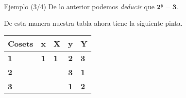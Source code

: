 \documentclass[aspectratio=169, 9pt]{beamer}
\begin{document}
\begin{frame}[fragile]{Ejemplo (3/4)}
	De lo anterior podemos \textit{deducir} que $\textbf{2}^y = \textbf{3}$.
	
	\medskip
	\begin{center}
	\end{center}
	\pause
	
	De esta manera nuestra tabla ahora tiene la siguiente pinta.
	

	
	
	\begin{table}[]
		\begin{tabular}{|l|l|l|l|l|}
			\hline
			Cosets     & x          & X          & y          & Y          \\ \hline
			\textbf{1} & \textbf{1} & \textbf{1} & \textbf{2} & \textbf{3} \\ \hline
			\textbf{2} &            &            & \color{verde}\textbf{3} &     \textbf{1}       \\ \hline
			{\textbf{3}} &            &            &   \textbf{1}         & \color{verde}\textbf{2} \\ \hline
		\end{tabular}
	\end{table}
	
	
\end{frame}
\end{document}
